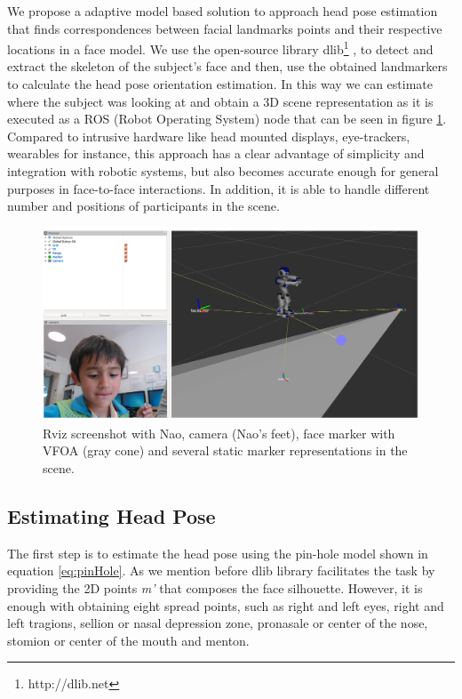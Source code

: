 \documentclass{sig-alternate}
\begin{document}
We propose a adaptive model based solution to approach head pose estimation that finds correspondences between facial landmarks points and their respective locations in a face model. We use the open-source library dlib\footnote{http://dlib.net} \cite{dlib09}, to detect and extract the skeleton of the subject's face and then, use the obtained landmarkers to calculate the head pose orientation estimation. In this way we can estimate where the subject was looking at and obtain a 3D scene representation as it is executed as a ROS (Robot Operating System) node that can be seen in figure \ref{rviz}. Compared to intrusive hardware like head mounted displays, eye-trackers, wearables for instance, this approach has a clear advantage of simplicity and integration with robotic systems, but also becomes accurate enough for general purposes in face-to-face interactions. In addition, it is able to handle different number and positions of participants in the scene.

\begin{figure}
    \centering
    \includegraphics[width=1\columnwidth]{rviz}
    \caption{\small Rviz screenshot with Nao, camera (Nao's feet), face marker with VFOA (gray cone) and several static marker representations in the scene.}
    \label{rviz}
\end{figure}

\subsection{Estimating Head Pose}
The first step is to estimate the head pose using the pin-hole model shown in equation \ref{eq:pinHole}. As we mention before dlib library facilitates the task by providing the 2D points \textit{m'} that composes the face silhouette. However, it is enough with obtaining eight spread points, such as right and left eyes, right and left tragions, sellion or nasal depression zone, pronasale or center of the nose, stomion or center of the mouth and menton.
\end{document}
